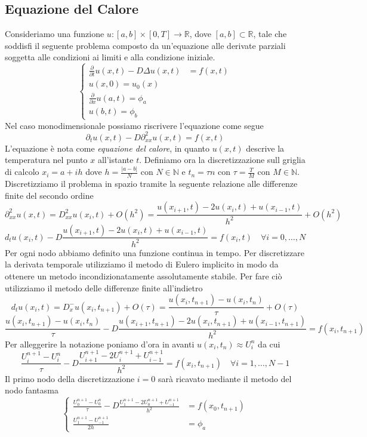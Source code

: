 \documentclass[11pt]{article}
\newcommand{\R}{\mathbb{R}}
\begin{document}
\subsection{Equazione del Calore}
Consideriamo una funzione \( u: [a,b] \times [0,T] \rightarrow \R \), dove \([a,b] \subset \R \), tale che soddisfi il seguente problema composto da un'equazione alle derivate parziali soggetta alle condizioni ai limiti e alla condizione iniziale. 
\[
\left\{
\begin{aligned}
\frac{\partial}{\partial t} u(x,t) - D \Delta u(x,t) &= f(x,t) \\
u(x,0) = u_0(x) \\
\frac{\partial}{\partial x} u(a,t) = \phi_a \\
u(b,t)=\phi_b
\end{aligned}
\right.
\]
Nel caso monodimensionale possiamo riscrivere l'equazione come segue
\[ \partial_t u(x,t) - D \partial_{xx}^2 u(x,t) = f(x,t) \]
L'equazione è nota come \textit{equazione del calore}, in quanto \(u(x,t)\) descrive la temperatura nel punto \(x\) all'istante \(t\). 
Definiamo ora la discretizzazione sull griglia di calcolo \( x_i= a + ih \) dove \(h = \frac{|a-b|}{N} \) con \( N \in \mathbb{N} \)
e \( t_n= \tau n\) con \( \tau = \frac{T}{M} \) con \( M \in \mathbb{N} \). 
Discretizziamo il problema in spazio tramite la seguente relazione alle differenze finite del secondo ordine 
\[\partial_{xx}^2 u(x,t) = D_{xx}^2 u(x_i,t) + \textit{O}(h^2)= \frac{u(x_{i+1},t)-2u(x_i,t)+u(x_{i-1},t)}{h^2} + \textit{O}(h^2) \]
\[ d_t u(x_i,t) - D \frac{u(x_{i+1},t)-2u(x_i,t)+u(x_{i-1},t)}{h^2} = f(x_i,t) \quad \forall i= 0, \dots, N
\]
Per ogni nodo abbiamo definito una funzione continua in tempo. Per discretizzare la derivata temporale utilizziamo il metodo di Eulero implicito in modo da ottenere un metodo incondizionatamente assolutamente stabile. 
Per fare ciò utilizziamo il metodo delle differenze finite all'indietro
\[
d_t u(x_i,t) = D_x^-u(x_i, t_{n+1}) + \textit{O}( \tau ) =  \frac{u(x_i,t_{n+1})-u(x_i,t_n)}{\tau} + \textit{O}( \tau )
\]
\[
\frac{u(x_i,t_{n+1})-u(x_i,t_n)}{\tau}-D\frac{u(x_{i+1},t_{n+1})-2u(x_i,t_{n+1})+u(x_{i-1},t_{n+1})}{h^2}=f(x_i,t_{n+1})
\]
Per alleggerire la notazione poniamo d'ora in avanti \( u(x_i,t_n) \approx U_i^n \)
da cui 
\[
\frac{U_i^{n+1}-U_i^n}{\tau} - D \frac{U_{i+1}^{n+1}-2U_i^{n+1}+U_{i-1}^{n+1}}{h^2} = f(x_i,t_{n+1}) \quad \forall i= 1, \dots, N-1
\]
Il primo nodo della discretizzazione \( i=0 \) sarà ricavato mediante il metodo del nodo fantasma 
\[
\left\{
\begin{aligned}
\frac{U_0^{n+1} - U_0^n}{\tau} - D \frac{U_{1}^{n+1} - 2U_0^{n+1} + U_{-1}^{n+1}}{h^2} &= f(x_0, t_{n+1}) \\
\frac{U_1^{n+1}-U_{-1}^{n+1}}{2h} &= \phi_a
\end{aligned}
\right.
\]
\end{document}

